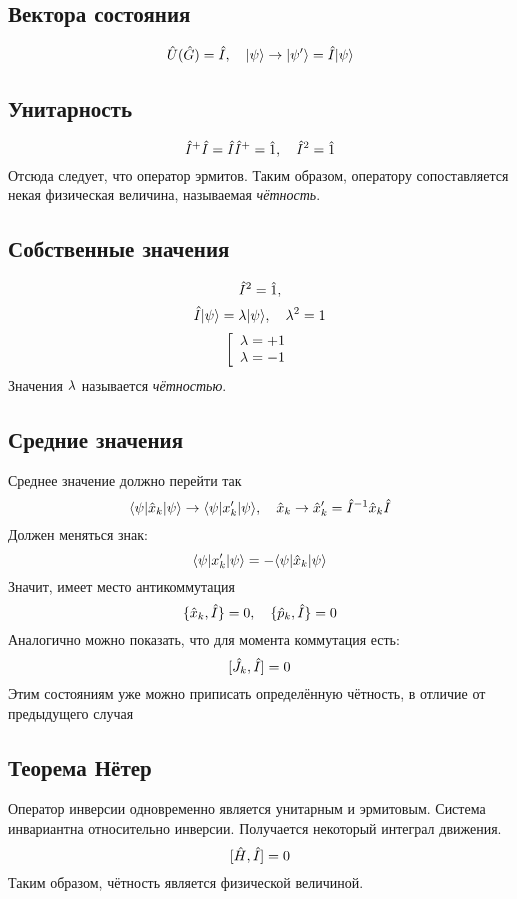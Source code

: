 \subsection{Вектора состояния}
$$
    \Hat U (\Hat G) = \Hat I, \quad | \psi \rangle \to | \psi' \rangle = \Hat I| \psi \rangle
$$
\subsection{Унитарность}
$$
    \Hat I^+ \Hat I = \Hat I \Hat I^+ = \Hat 1, \quad \Hat I^2 = \Hat 1
$$
Отсюда следует, что оператор эрмитов. Таким образом, оператору сопоставляется некая физическая величина, называемая \emph{чётность}. 
\subsection{Собственные значения}
$$
     \Hat I^2 = \Hat 1,
$$
$$
    \Hat I | \psi \rangle = \lambda | \psi \rangle, \quad \lambda^2 = 1
$$
$$
    \left[
        \begin{array}{c}
          \lambda = +1 \\
          \lambda = -1
        \end{array}
    \right.
$$
Значения $\lambda$ называется \emph{чётностью}.
\subsection{Средние значения}
Среднее значение должно перейти так
$$
    { \langle \psi |\Hat x_k| \psi \rangle } \to { \langle \psi |x'_k|\psi \rangle}, \quad \Hat x_k \to \Hat x_k' = \Hat I^{-1} \hat x_k \Hat I
$$
Должен меняться знак:
$$
    { \langle \psi | x_k'| \psi \rangle } = - { \langle \psi |\hat x_k| \psi \rangle }
$$
Значит, имеет место антикоммутация
$$
    \{ \Hat x_k, \Hat I \} = 0, \quad \{ \Hat p_k, \Hat I \} = 0
$$
Аналогично можно показать, что для момента коммутация есть:
$$
    [\Hat J_k, \Hat I] = 0
$$
Этим состояниям уже можно приписать определённую чётность, в отличие от предыдущего случая
\subsection{Теорема Нётер}
Оператор инверсии одновременно является унитарным и эрмитовым. Система инвариантна относительно инверсии. Получается некоторый интеграл движения.
$$
    [\Hat H, \Hat I] = 0
$$
Таким образом, чётность является физической величиной.